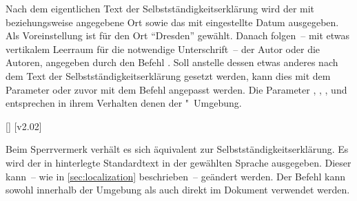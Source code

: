 \begin{DeclareEntity*}{}
\begin{DeclareEntity*}{}
\begin{DeclareEntity*}{}
\begin{Declaration}
\begin{Declaration}
\begin{Declaration}
\begin{Declaration}
\begin{Declaration}
\begin{Declaration}
\begin{Declaration}
\begin{Declaration}
\begin{Declaration}
\begin{Declaration}
Nach dem eigentlichen Text der Selbstständigkeitserklärung wird der mit 
 beziehungsweise  angegebene Ort 
sowie das mit  eingestellte Datum ausgegeben. Als Voreinstellung 
ist für den Ort \enquote{Dresden} gewählt. Danach folgen~-- mit etwas 
vertikalem Leerraum für die notwendige Unterschrift~-- der Autor oder die 
Autoren, angegeben durch den Befehl . Soll anstelle dessen etwas 
anderes nach dem Text der Selbstständigkeitserklärung gesetzt werden, kann dies 
mit dem Parameter  oder zuvor mit dem 
Befehl  angepasst werden. Die Parameter 
, 
, 
, 
 und 
 entsprechen in ihrem Verhalten denen 
der "~Umgebung.
\end{Declaration}
\end{Declaration}
\end{Declaration}
\end{Declaration}
\end{Declaration}
\end{Declaration}
\end{Declaration}
\end{Declaration}
\end{Declaration}
\end{Declaration}

\begin{Declaration}
  {[]}
  [v2.02]
\begin{Declaration}
  {}
\begin{Declaration}
  {}
\begin{Declaration}
  {}
\begin{Declaration}
  {}
\begin{Declaration}
  {}
\begin{Declaration}
  {}
\printdeclarationlist

Beim Sperrvermerk verhält es sich äquivalent zur Selbstständigkeitserklärung.
Es wird der in  hinterlegte Standardtext in der gewählten 
Sprache ausgegeben. Dieser kann~-- wie in \autoref{sec:localization} 
beschrieben~-- geändert werden. Der Befehl  kann sowohl 
innerhalb der Umgebung  als auch direkt im Dokument 
verwendet werden. 


\end{Declaration}
\end{Declaration}
\end{Declaration}
\end{Declaration}
\end{Declaration}
\end{Declaration}
\end{Declaration}
\end{DeclareEntity*}
\end{DeclareEntity*}
\end{DeclareEntity*}
